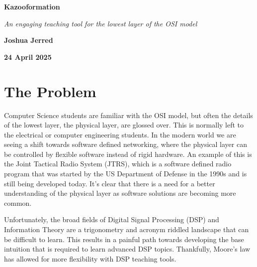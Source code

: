 \documentclass[]{article}
\begin{document}
\setlength{\parskip}{12pt}

\begin{titlepage}
  \begin{center}
  \textbf{\Huge Kazooformation} \par
  \vspace{0.5cm}
  \textit{An engaging teaching tool for the lowest layer of the OSI model} \par
  \vspace{1.5cm}
  \textbf{Joshua Jerred} \par
  \vspace{1cm}
   \par
   \par
  \vfill %
  \textbf{24 April 2025}
  \end{center}
\end{titlepage}

\section{The Problem}



Computer Science students are familiar with the OSI model, but often the details of the lowest layer, the physical layer, are glossed over. This is normally left to the electrical or computer engineering students. In the modern world we are seeing a shift towards software defined networking, where the physical layer can be controlled by flexible software instead of rigid hardware\cite{ibmWhatSoftwareDefined}. An example of this is the Joint Tactical Radio System (JTRS), which is a software defined radio program that was started by the US Department of Defense in the 1990s and is still being developed today\cite{Cox_2001}. It's clear that there is a need for a better understanding of the physical layer as software solutions are becoming more common.


Unfortunately, the broad fields of Digital Signal Processing (DSP) and Information Theory are a trigonometry and acronym riddled landscape that can be difficult to learn. This results in a painful path towards developing the base intuition that is required to learn advanced DSP topics. Thankfully, Moore's law
has allowed for more flexibility with DSP teaching tools.
\end{document}
